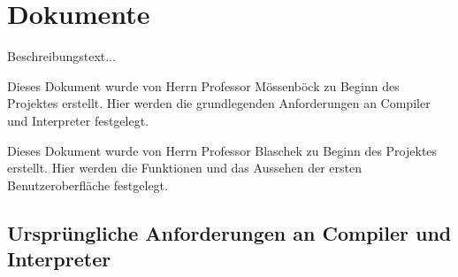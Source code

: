 \documentclass[11pt, oneside]{book}   		%
\begin{document}









\fi






\appendix
\renewcommand{\thechapter}{\Alph{chapter}}

\setcounter{chapter}{0} 

\chapter{Dokumente}
Beschreibungstext...

Dieses Dokument wurde von Herrn Professor Mössenböck zu Beginn des Projektes erstellt. Hier werden die grundlegenden Anforderungen an Compiler und Interpreter festgelegt.

Dieses Dokument wurde von Herrn Professor Blaschek zu Beginn des Projektes erstellt. Hier werden die Funktionen und das Aussehen der ersten Benutzeroberfläche festgelegt.

\pagebreak
\section{Ursprüngliche Anforderungen an Compiler und Interpreter}
\label{app:anf-comp}
\end{document}
